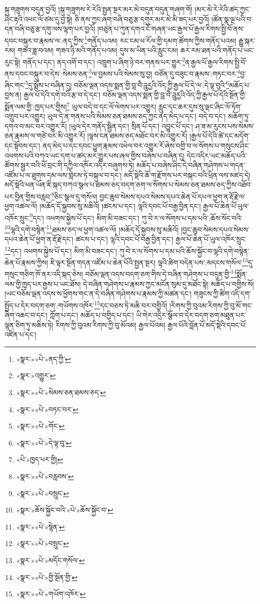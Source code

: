 སྐུ་གཟུགས་བདུན་བྱའོ། །སྐུ་གཟུགས་རེ་རེའི་སྤྱན་སྔར་མར་མེ་བདུན་བདུན་གཞག་གོ། །མར་མེ་རེ་རེའི་ཚད་ཀྱང་ཤིང་རྟའི་འཕང་ལོ་ཙམ་དུ་བྱ་སྟེ། ཅི་ནས་ཀྱང་ཞག་བཞི་བཅུ་རྩ་དགུར་མར་མེ་མི་ཟད་པར་བྱའོ། །ཚོན་སྣ་ལྔ་པའི་བ་དན་བཞི་བཅུ་རྩ་དགུ་ལས་ལྷག་པར་བྱའོ། །བཙུན་པ་ཀུན་དགའ་ངོ་གཞན་ཡང་རྒྱལ་པོ་རྒྱལ་རིགས་སྤྱི་བོ་ནས་དབང་བསྐུར་བ་རྣམས་ལ་:ནད་ཀྱིས་\footnote{«སྣར་»«པེ་»ནད་ཀྱི་}གནོད་པའམ། རང་ངམ་ཕ་རོལ་གྱི་དམག་ཚོགས་ཀྱིས་གནོད་པའམ། རྒྱུ་སྐར་རམ། གཟའ་ཟླ་བའམ། གཟའ་ཉི་མའི་གནོད་པའམ། དུས་མ་ཡིན་པའི་རླུང་ངམ། ཆར་རམ་ཐན་པའི་གནོད་པ་ཡང་རུང་སྟེ། གནོད་པ་དང་། ནད་འགོ་བ་དང་། འཁྲུག་པ་ཞིག་ཉེ་བར་གནས་པར་གྱུར་\footnote{«སྣར་»འགྱུར་}ན་རྒྱལ་པོ་རྒྱལ་རིགས་སྤྱི་བོ་ནས་དབང་བསྐུར་བ་དེས་:སེམས་ཅན་\footnote{«སྣར་»«པེ་»སེམས་ཅན་ཐམས་ཅད་}ལ་བྱམས་པའི་སེམས་སུ་བྱ། བཙོན་དུ་བཟུང་བ་རྣམས་:གཏང་བར་\footnote{«སྣར་»«པེ་»བཏང་བར་}བྱ་ཞིང་གང་\footnote{«སྣར་»«པེ་»གོང་}དུ་སྨོས་པ་བཞིན་དུ། བཅོམ་ལྡན་འདས་སྨན་གྱི་བླ་བཻ་ཌཱུརྱའི་འོད་ཀྱི་རྒྱལ་པོ་དེ་ལ་:དེ་ལྟ་བུའི་\footnote{«སྣར་»«པེ་»དེ་ལྟ་བུ་}མཆོད་པ་བྱས་ན། རྒྱལ་པོ་དེའི་དགེ་བའི་རྩ་བ་དེ་དང་། བཅོམ་ལྡན་འདས་སྨན་གྱི་བླ་བཻ་ཌཱུརྱའི་འོད་ཀྱི་རྒྱལ་པོ་དེའི་སྔོན་གྱི་སྨོན་ལམ་གྱི་:ཁྱད་པར་གྱིས།\footnote{«པེ་»ཁྱད་པར་གྱི།} ཡུལ་བདེ་བ་དང་ལོ་ལེགས་པར་འགྱུར། རླུང་དང་ཆར་དུས་སུ་ལྡང་ཞིང་ལོ་ཏོག་འགྲུབ་པར་འགྱུར། ཡུལ་དེ་ན་གནས་པའི་སེམས་ཅན་ཐམས་ཅད་ཀྱང་ནད་མེད་པ་དང་། བདེ་བ་དང་། མཆོག་ཏུ་དགའ་བ་མང་བར་འགྱུར་རོ། །ཡུལ་དེར་གནོད་སྦྱིན་དང་། སྲིན་པོ་དང་། འབྱུང་པོ་དང་། ཤ་ཟ་མ་རུངས་པས་སེམས་ཅན་རྣམས་ལ་གཙེ་བར་མི་འགྱུར་རོ། །ལྟས་ངན་ཐམས་ཅད་མཐོང་བར་མི་འགྱུར་རོ། །རྒྱལ་པོ་དེའི་ཚེ་དང་མདོག་དང་སྟོབས་དང་། ནད་མེད་པ་དང་དབང་ཕྱུག་རྣམས་འཕེལ་བར་འགྱུར་རོ་ཞེས་བགྱི་བ་ལ་སོགས་པ་གསུངས་ཤིང་འཕགས་པའི་བཀའ་ཡང་དག་པ་ཚད་མར་གྱུར་པས་ཞལ་གྱིས་བཞེས་པ་བཞིན་དུ། དེང་འདིར་ཡང་མཆོད་པའི་ཚོགས་སྦྱར་བའི་ཕོ་བྲང་གི་དཀྱིལ་འཁོར་འདིར་བཞུགས་ཏེ། མཆོད་པ་བཞེས་ཤིང་དེ་བཞིན་གཤེགས་པ་གདན་འཛོམ་པ་ལ་ཐུགས་དམ་ལས་གླེངས་ཏེ་བསྐུལ་བ་དང་། མདོ་སྡེའི་ཆོ་ག་རྫོགས་པར་བསྐང་བའི་ཕྲིན་ལས་མཛད་དེ། མདོ་སྡེའི་ཕན་ཡོན་ཇི་སྐད་བཀའ་སྩལ་པ་ཐམས་ཅད་བདག་ཅག་ལ་སོགས་པ་སེམས་ཅན་ཐམས་ཅད་ཀྱིས་འཐོབ་པར་བྱིན་གྱིས་བརླབ་\footnote{«སྣར་»«པེ་»བརླབས་}ཅིང་སྩལ་དུ་གསོལ། བྱང་ཆུབ་སེམས་དཔའ་སེམས་དཔའ་ཆེན་པོ་དཔལ་ཕྱག་ན་རྡོ་རྗེ་ལ་ཕྱག་འཚལ་ལོ། །མཆོད་དོ་སྐྱབས་སུ་མཆིའོ། །ཚངས་པ་དང་། ལྷའི་དབང་པོ་བརྒྱ་བྱིན་དང་། རྒྱལ་པོ་ཆེན་པོ་ཡུལ་འཁོར་སྲུང་\footnote{«སྣར་»«པེ་»བསྲུང་}དང་། འཕགས་སྐྱེས་པོ་དང་། མིག་མི་བཟང་དང་། ཀུ་བེ་ར་ལ་སོགས་པ་དམ་པའི་:ཆོས་སོང་བའི་\footnote{«སྣར་»ཆོས་སྐྱོང་བའི་«པེ་»ཆོས་སྐྱོང་བ་}ལྷའི་དགེ་བསྙེན་\footnote{«སྣར་»«པེ་»སྙེན་}ཐམས་ཅད་ལ་ཕྱག་འཚལ་ལོ། །མཆོད་དོ་སྐྱབས་སུ་མཆིའོ། །བྱང་ཆུབ་སེམས་དཔའ་སེམས་དཔའ་ཆེན་པོ་ཕྱག་ན་རྡོ་རྗེ་དང་། ཚངས་པ་དང་། ལྷའི་དབང་པོ་བརྒྱ་བྱིན་དང་། རྒྱལ་པོ་ཆེན་པོ་ཡུལ་འཁོར་སྲུང་\footnote{«སྣར་»«པེ་»བསྲུང་}དང་། འཕགས་སྐྱེས་པོ་དང་། མིག་མི་བཟང་དང་། ཀུ་བེ་ར་ལ་སོགས་པ་དམ་པའི་ཆོས་སྐྱོང་བ་ལྷའི་དགེ་བསྙེན་ཆེན་པོ་རྣམས་ཀྱིས། ཇི་ལྟར་སྔོན་གདན་འཛོམ་པ་ཆེན་པོའི་སྤྱན་སྔར། ལྷའི་ཚིག་བདེན་པས་:མདངས་གསོལ་\footnote{«སྣར་»«པེ་»མདོང་གསོལ་}དུ་གསུང་གཅིག་ཁོ་ནར་འདི་སྐད་ཅེས། བཅོམ་ལྡན་འདས་བདག་ཅག་གིས་དེ་བཞིན་གཤེགས་པ་བདུན་གྱི་\footnote{«སྣར་»«པེ་»གྱི་སྔོན་གྱི་}སྨོན་ལམ་གྱི་ཁྱད་པར་རྒྱས་པ་ཡང་ཐོས། དེ་བཞིན་གཤེགས་པ་རྣམས་ཀྱང་མངོན་སུམ་དུ་མཐོང་སྟེ། མཆོད་པ་བགྱིས་སོ། །ཡང་བཅོམ་ལྡན་འདས་ས་ཕྱོགས་གང་ན་དེ་བཞིན་གཤེགས་པ་རྣམས་ཀྱི་མཚན་དང་། གཟུངས་ཀྱི་ཚིག་འདི་དག་སྤྱོད་པ་དེར་བདག་ཅག་:གཡོགས་འཁོར་\footnote{«སྣར་»«པེ་»གཡོག་འཁོར་}དང་བཅས་ཏེ་མཆི་བར་བགྱིའོ། །རིགས་ཀྱི་བུའམ་རིགས་ཀྱི་བུ་མོ་གང་ཞིག་འཆང་བ་དང་། ཀློག་པ་དང་། མཆོད་པ་བགྱིད་པ་དང་། ཡི་གེར་འདྲིར་སྩོལ་བ་དེར་བདག་ཅག་མཐུན་པར་ལྷན་ཅིག་ཏུ་མཆིས་ཏེ། རིགས་ཀྱི་བུའམ་རིགས་ཀྱི་བུ་མོའམ། རྒྱལ་པོའམ། རྒྱལ་པོའི་བློན་པོ་མདོ་སྡེའི་དབང་པོ་འཛིན་པ་དང་། 
